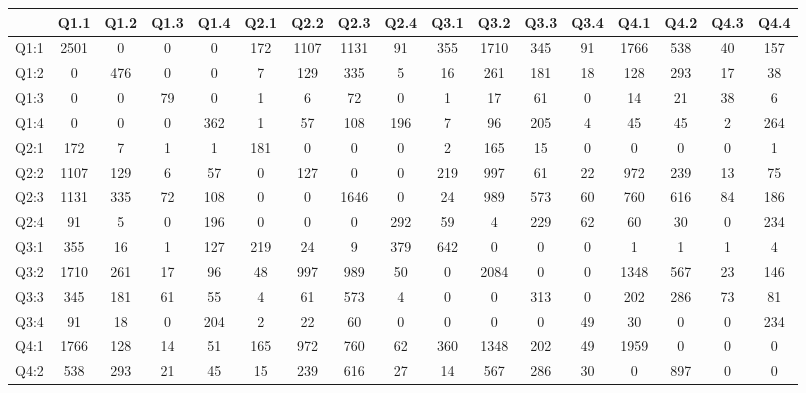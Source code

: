 \begin{itemize}
\begin{table}[h!]
{        \begin{tabular}[width=\textwidth]{c|cccc|cccc|cccc|cccc|}       
                 & Q1.1 & Q1.2 & Q1.3 & Q1.4 & Q2.1 & Q2.2 & Q2.3 & Q2.4 & Q3.1 & Q3.2 & Q3.3 & Q3.4 & Q4.1 & Q4.2 & Q4.3 & Q4.4 \\
            \hline
            Q1:1 & 2501 & 0    & 0    & 0    & 172  & 1107 & 1131 & 91   & 355  & 1710 & 345  & 91   & 1766 & 538  & 40   & 157  \\
            Q1:2 & 0    & 476  & 0    & 0    & 7    & 129  & 335  & 5    & 16   & 261  & 181  & 18   & 128  & 293  & 17   & 38   \\
            Q1:3 & 0    & 0    & 79   & 0    & 1    & 6    & 72   & 0    & 1    & 17   & 61   & 0    & 14   & 21   & 38   & 6    \\
            Q1:4 & 0    & 0    & 0    & 362  & 1    & 57   & 108  & 196  & 7    & 96   & 205  & 4    & 45   & 45   & 2    & 264  \\
            \hline
            Q2:1 & 172  & 7    & 1    & 1    & 181  & 0    & 0    & 0    & 2    & 165  & 15   & 0    & 0    & 0    & 0    & 1    \\
            Q2:2 & 1107 & 129  & 6    & 57   & 0    & 127  & 0    & 0    & 219  & 997  & 61   & 22   & 972  & 239  & 13   & 75   \\
            Q2:3 & 1131 & 335  & 72   & 108  & 0    & 0    & 1646 & 0    & 24   & 989  & 573  & 60   & 760  & 616  & 84   & 186  \\
            Q2:4 & 91   & 5    & 0    & 196  & 0    & 0    & 0    & 292  & 59   & 4    & 229  & 62   & 60   & 30   & 0    & 234  \\
            \hline
            Q3:1 & 355  & 16   & 1    & 127  & 219  & 24   & 9    & 379  & 642  & 0    & 0    & 0    & 1    & 1    & 1    & 4    \\
            Q3:2 & 1710 & 261  & 17   & 96   & 48   & 997  & 989  & 50   & 0    & 2084 & 0    & 0    & 1348 & 567  & 23   & 146  \\
            Q3:3 & 345  & 181  & 61   & 55   & 4    & 61   & 573  & 4    & 0    & 0    & 313  & 0    & 202  & 286  & 73   & 81   \\
            Q3:4 & 91   & 18   & 0    & 204  & 2    & 22   & 60   & 0    & 0    & 0    & 0    & 49   & 30   & 0    & 0    & 234  \\
            \hline
            Q4:1 & 1766 & 128  & 14   & 51   & 165  & 972  & 760  & 62   & 360  & 1348 & 202  & 49   & 1959 & 0    & 0    & 0    \\
            Q4:2 & 538  & 293  & 21   & 45   & 15   & 239  & 616  & 27   & 14   & 567  & 286  & 30   & 0    & 897  & 0    & 0    \\

\end{tabular}}
\end{table}
\end{itemize}
